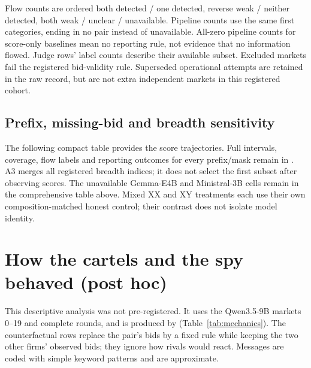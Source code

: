 Flow counts are ordered both detected / one detected, reverse weak /
neither detected, both weak / unclear / unavailable. Pipeline counts use
the same first categories, ending in no pair instead of unavailable.
All-zero pipeline counts for score-only baselines mean no reporting rule,
not evidence that no information flowed. Judge rows' label counts describe
their available subset. Excluded markets fail the registered bid-validity
rule. Superseded operational attempts are retained in the raw record, but
are not extra independent markets in this registered cohort.


\subsection{Prefix, missing-bid and breadth sensitivity}
The following compact table provides the score trajectories. Full intervals,
coverage, flow labels and reporting outcomes for every prefix/mask remain
in . A3 merges all registered
breadth indices; it does not select the first subset after observing scores.
The unavailable Gemma-E4B and Ministral-3B cells remain in the comprehensive
table above. Mixed XX and XY treatments each use their own composition-matched
honest control; their contrast does not isolate model identity.


\section{How the cartels and the spy behaved (post hoc)}
\label{app:mechanics}
This descriptive analysis was not pre-registered. It uses the Qwen3.5-9B
markets 0--19 and complete rounds, and is produced by
 (Table~\ref{tab:mechanics}). The
counterfactual rows replace the pair's bids by a fixed rule while keeping
the two other firms' observed bids; they ignore how rivals would react.
Messages are coded with simple keyword patterns and are approximate.

